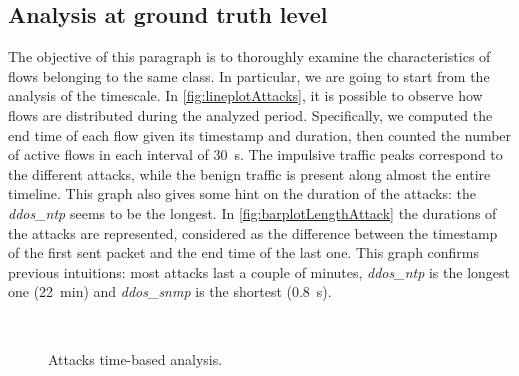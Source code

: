 \documentclass[acmlarge,nonacm]{acmart}
\begin{document}
\subsection{Analysis at ground truth level} \label{sec:groundTruth}
The objective of this paragraph is to thoroughly examine the characteristics of flows belonging to the same class. In particular, we are going to start from the analysis of the timescale. In \cref{fig:lineplotAttacks}, it is possible to observe how flows are distributed during the analyzed period. Specifically, we computed the end time of each flow given its timestamp and duration, then counted the number of active flows in each interval of \SI{30}{\second}. The impulsive traffic peaks correspond to the different attacks, while the benign traffic is present along almost the entire timeline. This graph also gives some hint on the duration of the attacks: the \emph{ddos\_ntp} seems to be the longest. In \cref{fig:barplotLengthAttack} the durations of the attacks are represented, considered as the difference between the timestamp of the first sent packet and the end time of the last one. This graph confirms previous intuitions: most attacks last a couple of minutes, \emph{ddos\_ntp} is the longest one (\SI{22}{\minute}) and \emph{ddos\_snmp} is the shortest (\SI{0.8}{\second}).

\begin{figure}
	\centering
     \quad
	  \\
  	\caption{Attacks time-based analysis.}
\end{figure}
\end{document}
